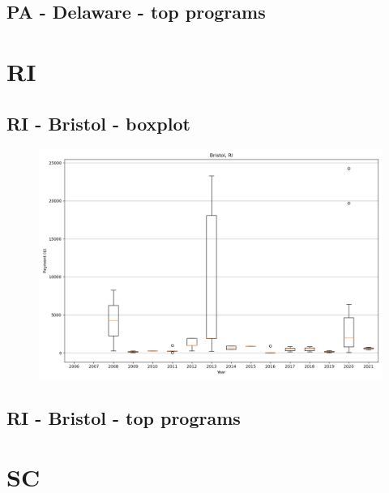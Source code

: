 \subsection*{PA - Delaware - top programs}

\newpage
\section*{RI}
\subsection*{RI - Bristol - boxplot}
\begin{figure}[h]
\centering
\includegraphics[width=7in]{../output/boxplots/counties/Bristol-RI_boxplot.png}
\end{figure}


\subsection*{RI - Bristol - top programs}

\newpage
\section*{SC}
